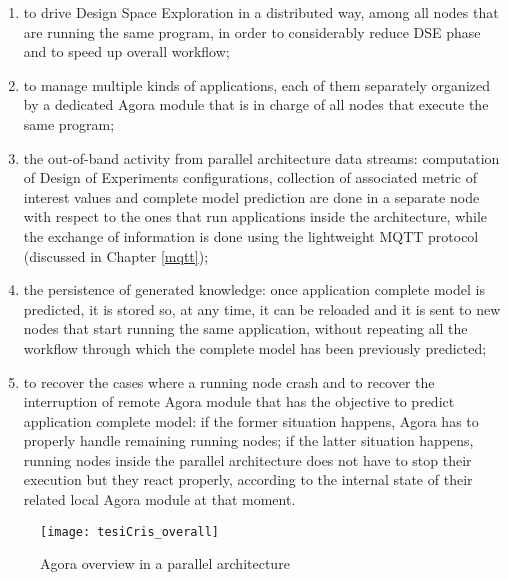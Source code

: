 \begin{enumerate}
    
    \item to drive Design Space Exploration in a distributed way, among all nodes that are running the same program, in order to considerably reduce DSE phase and to speed up overall workflow;
    
    \item to manage multiple kinds of applications, each of them separately organized by a dedicated Agora module that is in charge of all nodes that execute the same program;
    
    \item the out-of-band activity from parallel architecture data streams: computation of Design of Experiments configurations, collection of associated metric of interest values and complete model prediction are done in a separate node with respect to the ones that run applications inside the architecture, while the exchange of information is done using the lightweight MQTT protocol (discussed in Chapter \ref{mqtt});
    
    \item the persistence of generated knowledge: once application complete model is predicted, it is stored so, at any time, it can be reloaded and it is sent to new nodes that start running the same application, without repeating all the workflow through which the complete model has been previously predicted;
    
    \item to recover the cases where a running node crash and to recover the interruption of remote Agora module that has the objective to predict application complete model: if the former situation happens, Agora has to properly handle remaining running nodes; if the latter situation happens, running nodes inside the parallel architecture does not have to stop their execution but they react properly, according to the internal state of their related local Agora module at that moment.

\end{enumerate}

\begin{figure}[htb]

    \centering
    \texttt{[image: tesiCris\_overall]}
    \caption{Agora overview in a parallel architecture}
    \label{fig::tesiCris_overview}
    
\end{figure}

